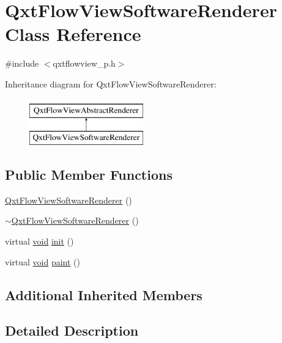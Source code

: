 \hypertarget{class_qxt_flow_view_software_renderer}{\section{Qxt\-Flow\-View\-Software\-Renderer Class Reference}
\label{class_qxt_flow_view_software_renderer}
}


{\ttfamily \#include $<$qxtflowview\-\_\-p.\-h$>$}

Inheritance diagram for Qxt\-Flow\-View\-Software\-Renderer\-:\begin{figure}[H]
\begin{center}
\leavevmode
\includegraphics[height=2.000000cm]{class_qxt_flow_view_software_renderer}
\end{center}
\end{figure}
\subsection*{Public Member Functions}
\begin{DoxyCompactItemize}
\item 
\hyperlink{class_qxt_flow_view_software_renderer_a0470724f054d7e7c3b306ee7db206118}{Qxt\-Flow\-View\-Software\-Renderer} ()
\item 
\hyperlink{class_qxt_flow_view_software_renderer_a9767ac8d9e0ae2dc23050caf47bb3665}{$\sim$\-Qxt\-Flow\-View\-Software\-Renderer} ()
\item 
virtual \hyperlink{group___u_a_v_objects_plugin_ga444cf2ff3f0ecbe028adce838d373f5c}{void} \hyperlink{class_qxt_flow_view_software_renderer_a8df65ba654c03b4e2055e5eaad02a629}{init} ()
\item 
virtual \hyperlink{group___u_a_v_objects_plugin_ga444cf2ff3f0ecbe028adce838d373f5c}{void} \hyperlink{class_qxt_flow_view_software_renderer_ae97307b6f047712f2a26d5cc5af967fd}{paint} ()
\end{DoxyCompactItemize}
\subsection*{Additional Inherited Members}


\subsection{Detailed Description}


